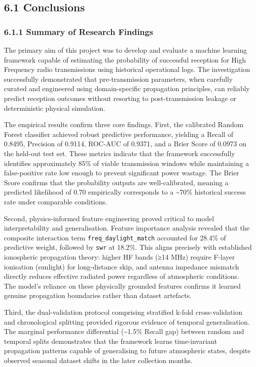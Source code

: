 \subsection{6.1 Conclusions}\label{conclusions}

\subsubsection{6.1.1 Summary of Research
Findings}\label{summary-of-research-findings}

The primary aim of this project was to develop and evaluate a machine
learning framework capable of estimating the probability of successful
reception for High Frequency radio transmissions using historical
operational logs. The investigation successfully demonstrated that
pre-transmission parameters, when carefully curated and engineered using
domain-specific propagation principles, can reliably predict reception
outcomes without resorting to post-transmission leakage or deterministic
physical simulation.

The empirical results confirm three core findings. First, the calibrated
Random Forest classifier achieved robust predictive performance,
yielding a Recall of 0.8495, Precision of 0.9114, ROC-AUC of 0.9371, and
a Brier Score of 0.0973 on the held-out test set. These metrics indicate
that the framework successfully identifies approximately 85\% of viable
transmission windows while maintaining a false-positive rate low enough
to prevent significant power wastage. The Brier Score confirms that the
probability outputs are well-calibrated, meaning a predicted likelihood
of 0.70 empirically corresponds to a \textasciitilde70\% historical
success rate under comparable conditions.

Second, physics-informed feature engineering proved critical to model
interpretability and generalisation. Feature importance analysis
revealed that the composite interaction term
\texttt{freq\_daylight\_match} accounted for 28.4\% of predictive
weight, followed by \texttt{swr} at 18.2\%. This aligns precisely with
established ionospheric propagation theory: higher HF bands (≥14 MHz)
require F-layer ionisation (sunlight) for long-distance skip, and
antenna impedance mismatch directly reduces effective radiated power
regardless of atmospheric conditions. The model's reliance on these
physically grounded features confirms it learned genuine propagation
boundaries rather than dataset artefacts.

Third, the dual-validation protocol comprising stratified k-fold
cross-validation and chronological splitting provided rigorous evidence
of temporal generalisation. The marginal performance differential
(\textasciitilde1.5\% Recall gap) between random and temporal splits
demonstrates that the framework learns time-invariant propagation
patterns capable of generalising to future atmospheric states, despite
observed seasonal dataset shifts in the later collection months.


